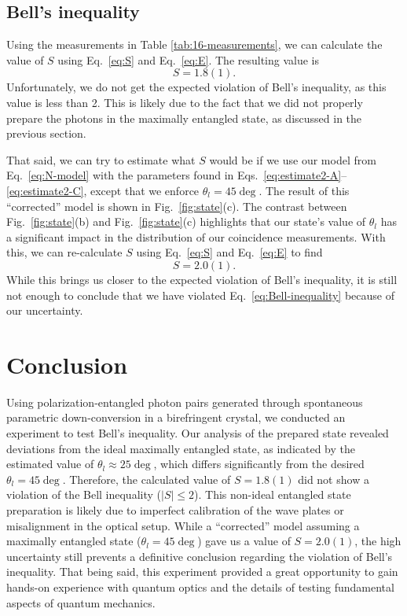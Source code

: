 \documentclass{../paper}
\newcommand{\eq}[1]{Eq.~\eqref{#1}}
\newcommand{\eqs}[2]{Eqs.~\eqref{#1}--\eqref{#2}}
\newcommand{\fig}[1]{Fig.~\ref{#1}}
\begin{document}
\subsection{Bell's inequality}

Using the measurements in Table \ref{tab:16-measurements}, we can calculate the value of $S$ using \eq{eq:S} and \eq{eq:E}. The resulting value is
\begin{equation}
  S = 1.8(1).
\end{equation}
Unfortunately, we do not get the expected violation of Bell's inequality, as this value is less than 2. This is likely due to the fact that we did not properly prepare the photons in the maximally entangled state, as discussed in the previous section.

That said, we can try to estimate what $S$ would be if we use our model from \eq{eq:N-model} with the parameters found in \eqs{eq:estimate2-A}{eq:estimate2-C}, except that we enforce $\theta_l = 45\deg$. The result of this ``corrected'' model is shown in \fig{fig:state}(c). The contrast between \fig{fig:state}(b) and \fig{fig:state}(c) highlights that our state's value of $\theta_l$ has a significant impact in the distribution of our coincidence measurements. With this, we can re-calculate $S$ using \eq{eq:S} and \eq{eq:E} to find
\begin{equation}
  S = 2.0(1).
\end{equation}
While this brings us closer to the expected violation of Bell's inequality, it is still not enough to conclude that we have violated \eq{eq:Bell-inequality} because of our uncertainty.

\section{Conclusion}\label{sec:conclusion}

Using polarization-entangled photon pairs generated through spontaneous parametric down-conversion in a birefringent crystal, we conducted an experiment to test Bell's inequality. Our analysis of the prepared state revealed deviations from the ideal maximally entangled state, as indicated by the estimated value of $\theta_l \approx 25\deg$, which differs significantly from the desired $\theta_l = 45\deg$. Therefore, the calculated value of $S = 1.8(1)$ did not show a violation of the Bell inequality ($|S| \leq 2$). This non-ideal entangled state preparation is likely due to imperfect calibration of the wave plates or misalignment in the optical setup. While a ``corrected'' model assuming a maximally entangled state ($\theta_l = 45\deg$) gave us a value of $S = 2.0(1)$, the high uncertainty still prevents a definitive conclusion regarding the violation of Bell's inequality. That being said, this experiment provided a great opportunity to gain hands-on experience with quantum optics and the details of testing fundamental aspects of quantum mechanics.
\end{document}
